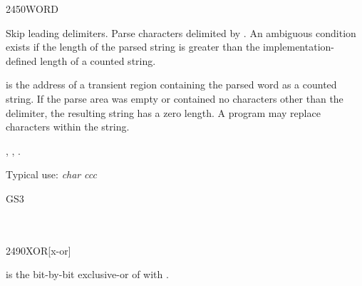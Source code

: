 \vspace*{-2ex}
\begin{worddef}{2450}{WORD}
\item {}

	Skip leading delimiters. Parse characters  delimited
	by .  An ambiguous condition exists if the length of
	the parsed string is greater than the implementation-defined
	length of a counted string.

	 is the address of a transient region containing
	the parsed word as a counted string. If the parse area was
	empty or contained no characters other than the delimiter, the
	resulting string has a zero length.
	A program may replace characters within the string.

\see {},
	,
	.

	\begin{rationale} %
		Typical use: \emph{char}  \emph{ccc}
	\end{rationale}

	\begin{testing} %
		\ttfamily
		\word{:} GS3     \word{;} \\
		 \\
		 \\
		 \hfill {} 
	\end{testing}
\end{worddef}

\vspace*{-3ex}
\begin{worddef}{2490}{XOR}[x-or]
\item {}

	 is the bit-by-bit exclusive-or of  with
	.

	\begin{testing} %
		 \\
		 \\
		 \\
	\end{testing}
\end{worddef}

